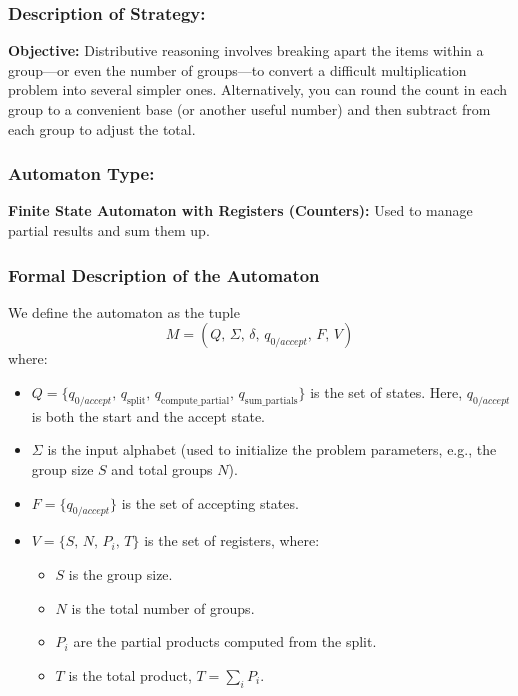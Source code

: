 \documentclass[11pt]{article}
\begin{document}
\subsubsection*{Description of Strategy:}

 \textbf{Objective:} Distributive reasoning involves breaking apart the items within a group—or even the number of groups—to convert a difficult multiplication problem into several simpler ones. Alternatively, you can round the count in each group to a convenient base (or another useful number) and then subtract from each group to adjust the total.
   

\subsubsection*{Automaton Type:}
\textbf{Finite State Automaton with Registers (Counters):}  
Used to manage partial results and sum them up.

\subsubsection*{Formal Description of the Automaton}

We define the automaton as the tuple
\[
M = (Q,\, \Sigma,\, \delta,\, q_{0/accept},\, F,\, V)
\]
where:
\begin{itemize}
    \item \( Q = \{q_{0/accept},\, q_{\text{split}},\, q_{\text{compute\_partial}},\, q_{\text{sum\_partials}}\} \) is the set of states. Here, \(q_{0/accept}\) is both the start and the accept state.
    \item \(\Sigma\) is the input alphabet (used to initialize the problem parameters, e.g., the group size \(S\) and total groups \(N\)).
    \item \( F = \{q_{0/accept}\} \) is the set of accepting states.
    \item \( V = \{S,\, N,\, P_i,\, T\} \) is the set of registers, where:
    \begin{itemize}
        \item \(S\) is the group size.
        \item \(N\) is the total number of groups.
        \item \(P_i\) are the partial products computed from the split.
        \item \(T\) is the total product, \(T = \sum_i P_i\).
    \end{itemize}
\end{itemize}
\end{document}
